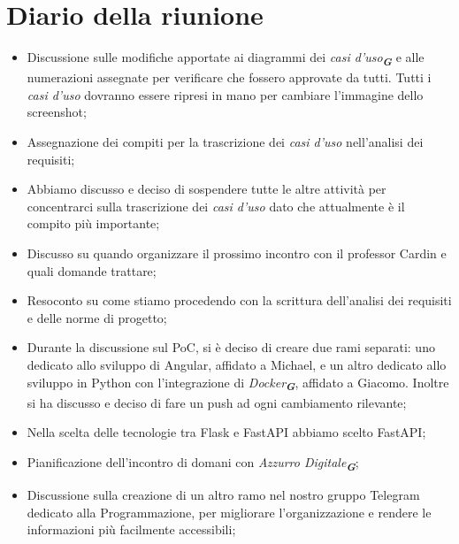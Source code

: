 
\section{Diario della riunione}

\begin{itemize}
    \item Discussione sulle modifiche apportate ai diagrammi dei \emph{casi d'uso}\textsubscript{\textit{\textbf{G}}} e alle numerazioni assegnate per verificare che fossero approvate da tutti. Tutti i \emph{casi d'uso} dovranno essere ripresi in mano per cambiare l'immagine dello screenshot;
    \item Assegnazione dei compiti per la trascrizione dei \emph{casi d'uso} nell'analisi dei requisiti;
    \item Abbiamo discusso e deciso di sospendere tutte le altre attività per concentrarci sulla trascrizione dei \emph{casi d'uso} dato che attualmente è il compito più importante;
    \item Discusso su quando organizzare il prossimo incontro con il professor Cardin e quali domande trattare;
    \item Resoconto su come stiamo procedendo con la scrittura dell'analisi dei requisiti e delle norme di progetto;
    \item Durante la discussione sul PoC, si è deciso di creare due rami separati: uno dedicato allo sviluppo di Angular, affidato a Michael, e un altro dedicato allo sviluppo in Python con l'integrazione di \emph{Docker}\textsubscript{\textit{\textbf{G}}}, affidato a Giacomo. Inoltre si ha discusso e deciso di fare un push ad ogni cambiamento rilevante;
    \item Nella scelta delle tecnologie tra Flask e FastAPI abbiamo scelto FastAPI;
    \item Pianificazione dell'incontro di domani con \emph{Azzurro Digitale}\textsubscript{\textit{\textbf{G}}};
    \item Discussione sulla creazione di un altro ramo nel nostro gruppo Telegram dedicato alla Programmazione, per migliorare l'organizzazione e rendere le informazioni più facilmente accessibili;
 \end{itemize}
